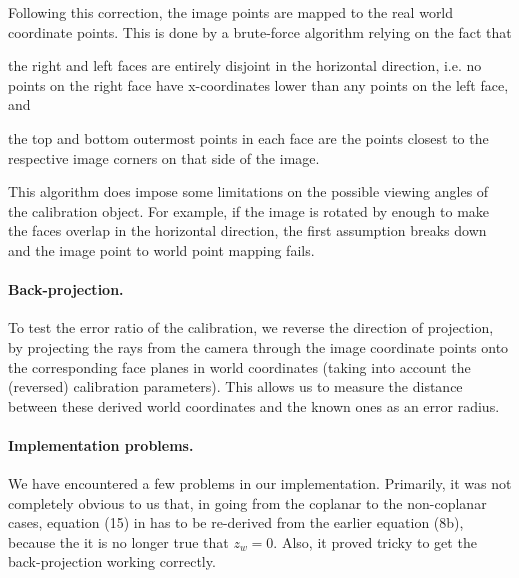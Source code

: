 Following this correction, the image points are mapped to the real
world coordinate points. This is done by a brute-force algorithm
relying on the fact that
\begin{inparaenum}[(a)]
  \item the right and left faces are entirely disjoint in the
    horizontal direction, i.e. no points on the right face have
    x-coordinates lower than any points on the left face, and
  \item the top and bottom outermost points in each face are the
    points closest to the respective image corners on that side of the
    image.
\end{inparaenum}
This algorithm does impose some limitations on the possible viewing
angles of the calibration object. For example, if the image is rotated
by enough to make the faces overlap in the horizontal direction, the
first assumption breaks down and the image point to world point
mapping fails.

\paragraph{Back-projection.}
To test the error ratio of the calibration, we reverse the direction
of projection, by projecting the rays from the camera through the
image coordinate points onto the corresponding face planes in world
coordinates (taking into account the (reversed) calibration
parameters). This allows us to measure the distance between these
derived world coordinates and the known ones as an error radius.

\paragraph{Implementation problems.}
We have encountered a few problems in our implementation. Primarily,
it was not completely obvious to us that, in going from the coplanar
to the non-coplanar cases, equation (15) in \cite{TSAI} has to be
re-derived from the earlier equation (8b), because the it is no longer
true that $z_w=0$. Also, it proved tricky to get the back-projection
working correctly.

